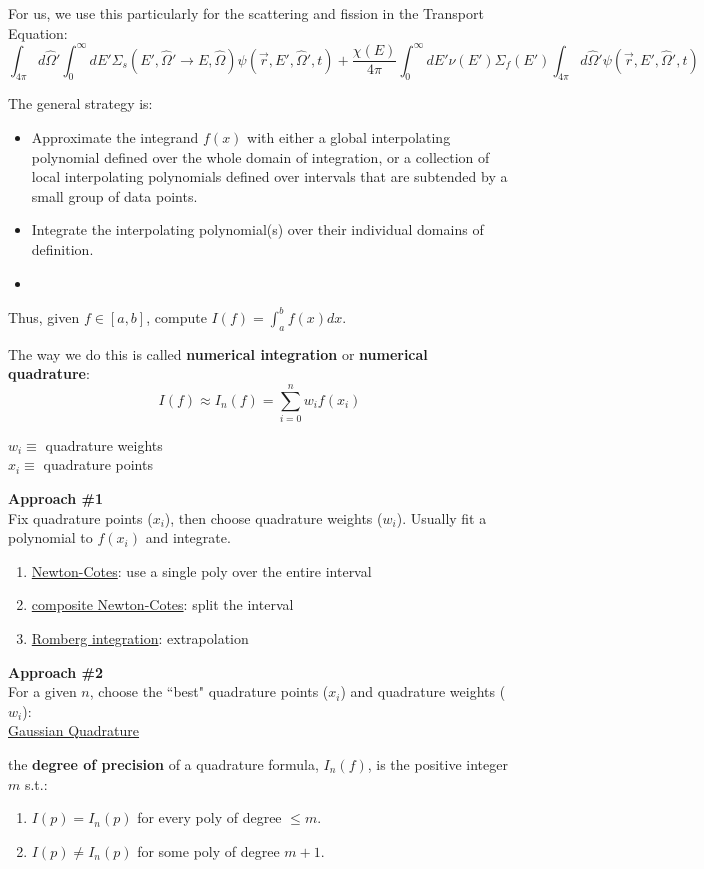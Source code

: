 \documentclass[12pt, answers]{exam}
\newcommand{\vOmega}{\ensuremath{\hat{\Omega}}}
\begin{document}
For us, we use this particularly for the scattering and fission in the Transport Equation:
\[\int_{4\pi} d\vOmega' \int_0^{\infty} dE' \Sigma_s(E', \vOmega' \rightarrow E, \vOmega) \psi(\vec{r}, E', \vOmega', t)  +
 \frac{\chi(E)}{4\pi} \int_0^{\infty} dE' \nu(E') \Sigma_f(E') \int_{4\pi} d\vOmega' \psi(\vec{r}, E', \vOmega', t) \]

The general strategy is:
\begin{itemize}
\item Approximate the integrand $f(x)$ with either a global interpolating
polynomial defined over the whole domain of integration, or a
collection of local interpolating polynomials defined over intervals
that are subtended by a small group of data points.
\ifprintanswers
\item Integrate the interpolating polynomial(s) over their individual
domains of definition.
\else
\item
\fi
\end{itemize}

Thus, given $f \in[a,b]$, compute $I(f) = \int_a^b f(x) dx$.

The way we do this is called \textbf{numerical integration} or \textbf{numerical quadrature}:
\ifprintanswers
\[I(f) \approx I_n(f) = \sum_{i=0}^n w_i f(x_i)\]
\vspace*{-3em}

$w_i \equiv$ quadrature weights\\
$x_i \equiv$ quadrature points
\else
\vspace*{4em}
\fi

\textbf{Approach \#1}\\
Fix quadrature points ($x_i$), then choose quadrature weights ($w_i$). Usually fit a polynomial to $f(x_i)$ and integrate.
%
\begin{enumerate}%
\item \underline{Newton-Cotes}: use a single poly over the entire interval
\item \underline{composite Newton-Cotes}: split the interval
\item \underline{Romberg integration}: extrapolation
\end{enumerate}

\textbf{Approach \#2}\\
For a given $n$, choose the ``best" quadrature points ($x_i$) and quadrature weights ($w_i$):\\
\underline{Gaussian Quadrature}

\vspace*{1em}
the \textbf{degree of precision} of a quadrature formula, $I_n(f)$, is the positive integer $m$ s.t.:
\begin{enumerate}
\item $I(p) = I_n(p)$ for every poly of degree $\leq m$.
\item $I(p) \neq I_n(p)$ for some poly of degree $m+1$.
\end{enumerate}
 
\end{document}
